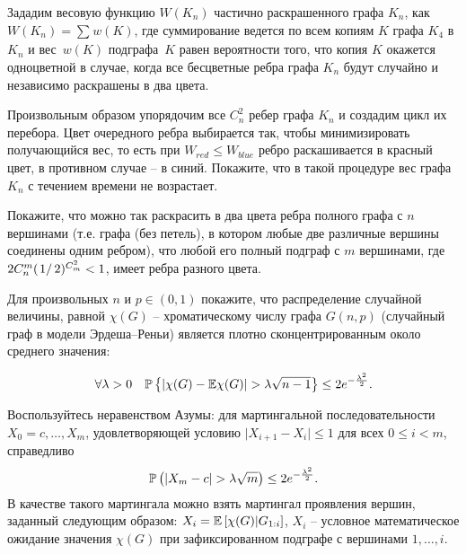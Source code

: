 \begin{ordre}

Зададим весовую функцию $W(K_{n} )$ частично раскрашенного графа $K_{n} $, как $W(K_{n} )=\sum _{}w(K) $, где суммирование ведется по всем копиям $K$ графа $K_{4} $ в $K_{n} $ и вес~$w(K)$ подграфа~$K$ равен вероятности того, что копия $K$ окажется одноцветной в случае, когда все бесцветные ребра графа $K_{n} $ будут случайно и независимо раскрашены в два цвета. 

Произвольным образом упорядочим все $C_{n}^{2} $ ребер графа $K_{n}$ и создадим цикл их перебора.   Цвет очередного ребра  выбирается так, чтобы минимизировать получающийся вес, то есть при $W_{red} \leq W_{blue} $ ребро раскашивается в красный цвет, в противном случае -- в синий. Покажите, что в такой процедуре вес графа $K_{n} $ с течением времени не возрастает. 

\end{ordre}


\begin{problem}
Покажите, что можно так раскрасить в два цвета ребра полного графа с $n$ вершинами (т.е. графа (без петель), в котором любые две 
различные вершины соединены одним ребром), что любой его полный подграф с $m$ вершинами, где 
$2C_n^m (\left.1\right/2)^{C_m^2}<1$, имеет ребра разного цвета. 
\end{problem}





\begin{problem} 
\label{azuma}

Для произвольных $n$ и $p\in (0, 1)$ покажите, что распределение случайной 
величины, равной $\chi (G)$ -- хроматическому числу графа $G(n,p)$ (случайный 
граф в модели Эрдеша--Реньи) является плотно сконцентрированным около 
среднего значения:

\[
\forall \lambda >0  \quad \mathrm{{\mathbb P}}\left\{ {\vert \chi (G)-\mathrm{{\mathbb E}}\chi (G)\vert >\lambda 
\sqrt {n-1} } \right\}\le 2e^{-\frac{\lambda ^2}{2}}.
\]

\end{problem}


\begin{ordre}

Воспользуйтесь неравенством Азумы: для мартингальной последовательности $X_0 =c,\ldots ,X_m $, удовлетворяющей условию $\vert X_{i+1} -X_i \vert \le 1$ для всех $0\le i< m$, справедливо 
\[
\mathrm{{\mathbb P}}\left( {\vert X_m -c\vert >\lambda \sqrt m } \right)\le 
2e^{-\frac{\lambda ^2}{2}}.
\]
В качестве такого мартингала можно взять мартингал проявления 
вершин, заданный следующим образом: $X_i = \mathrm{{\mathbb E}}\left[ {\chi (G)} \vert  G_{1:i}\right]$, $X_i$ -- условное математическое ожидание значения $\chi (G)$ при зафиксированном подграфе с вершинами $1,\ldots,i$.

\end{ordre}

